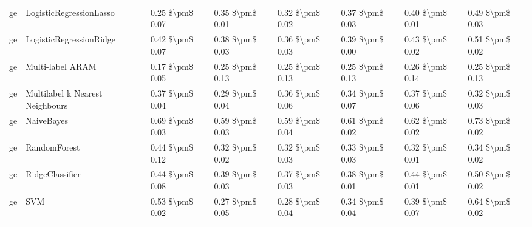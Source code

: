 \begin{tabular}{llllllll}
      ge &         LogisticRegressionLasso &     0.25 \$\textbackslash pm\$ 0.07 &           0.35 \$\textbackslash pm\$ 0.01 &       0.32 \$\textbackslash pm\$ 0.02 &        0.37 \$\textbackslash pm\$ 0.03 &                         0.40 \$\textbackslash pm\$ 0.01 &     0.49 \$\textbackslash pm\$ 0.03 \\
      ge &         LogisticRegressionRidge &     0.42 \$\textbackslash pm\$ 0.07 &           0.38 \$\textbackslash pm\$ 0.03 &       0.36 \$\textbackslash pm\$ 0.03 &        0.39 \$\textbackslash pm\$ 0.00 &                         0.43 \$\textbackslash pm\$ 0.02 &     0.51 \$\textbackslash pm\$ 0.02 \\
      ge &                Multi-label ARAM &     0.17 \$\textbackslash pm\$ 0.05 &           0.25 \$\textbackslash pm\$ 0.13 &       0.25 \$\textbackslash pm\$ 0.13 &        0.25 \$\textbackslash pm\$ 0.13 &                         0.26 \$\textbackslash pm\$ 0.14 &     0.25 \$\textbackslash pm\$ 0.13 \\
      ge & Multilabel k Nearest Neighbours &     0.37 \$\textbackslash pm\$ 0.04 &           0.29 \$\textbackslash pm\$ 0.04 &       0.36 \$\textbackslash pm\$ 0.06 &        0.34 \$\textbackslash pm\$ 0.07 &                         0.37 \$\textbackslash pm\$ 0.06 &     0.32 \$\textbackslash pm\$ 0.03 \\
      ge &                      NaiveBayes &     0.69 \$\textbackslash pm\$ 0.03 &           0.59 \$\textbackslash pm\$ 0.03 &       0.59 \$\textbackslash pm\$ 0.04 &        0.61 \$\textbackslash pm\$ 0.02 &                         0.62 \$\textbackslash pm\$ 0.02 &     0.73 \$\textbackslash pm\$ 0.02 \\
      ge &                    RandomForest &     0.44 \$\textbackslash pm\$ 0.12 &           0.32 \$\textbackslash pm\$ 0.02 &       0.32 \$\textbackslash pm\$ 0.03 &        0.33 \$\textbackslash pm\$ 0.03 &                         0.32 \$\textbackslash pm\$ 0.01 &     0.34 \$\textbackslash pm\$ 0.02 \\
      ge &                 RidgeClassifier &     0.44 \$\textbackslash pm\$ 0.08 &           0.39 \$\textbackslash pm\$ 0.03 &       0.37 \$\textbackslash pm\$ 0.03 &        0.38 \$\textbackslash pm\$ 0.01 &                         0.44 \$\textbackslash pm\$ 0.01 &     0.50 \$\textbackslash pm\$ 0.02 \\
      ge &                             SVM &     0.53 \$\textbackslash pm\$ 0.02 &           0.27 \$\textbackslash pm\$ 0.05 &       0.28 \$\textbackslash pm\$ 0.04 &        0.34 \$\textbackslash pm\$ 0.04 &                         0.39 \$\textbackslash pm\$ 0.07 &     0.64 \$\textbackslash pm\$ 0.02 \\

\end{tabular}
